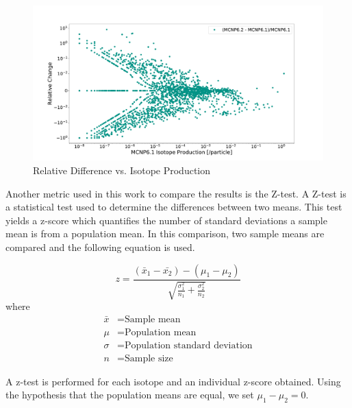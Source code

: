 \begin{figure}[ht!]
        \centering
        \includegraphics[scale=0.35]{figs/reldiff_merbox_62_61.pdf}
	\caption{Relative Difference vs. Isotope Production}
        \label{fig:reldiff}
\end{figure}

Another metric used in this work to compare the results is the Z-test.
A Z-test is a statistical test used to determine the differences between 
two means. This test yields a z-score which quantifies the 
number of standard deviations a sample mean is from a
population
mean. In this comparison, two sample means are compared and the following
equation is used. 

\begin{equation}\label{eq:ztest}
        z = \frac{(\bar{x}_{1} - \bar{x_{2}}) - (\mu_{1} - \mu_{2}) }
            {\sqrt{\frac{\sigma_{1}^{2}}{n_{1}} + \frac{\sigma_{2}^{2}}{n_{2}} }}
\end{equation}
where
\begin{equation}
\begin{split}
        \bar{x} &= \text{Sample mean} \\
        \mu     &= \text{Population mean} \\
        \sigma  &= \text{Population standard deviation} \\
        n       &= \text{Sample size}
\end{split}
\end{equation}

A z-test is performed for each isotope  and an individual z-score obtained. 
Using the hypothesis that the population means are equal, we set 
 $ \mu_{1} - \mu_{2} = 0$.

